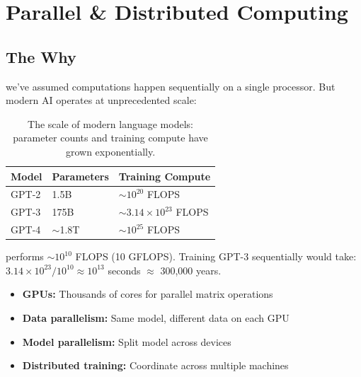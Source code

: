 \chapter{Parallel \& Distributed Computing}



\section{The Why}

 we've assumed computations happen sequentially on a single processor.
But modern AI operates at unprecedented scale:

\begin{table}[ht]
\centering
\begin{tabular}{p{}p{}p{}}
\toprule
\textbf{Model} & \textbf{Parameters} & \textbf{Training Compute} \\
\midrule
GPT-2 & 1.5B & $\sim 10^{20}$ FLOPS \\
GPT-3 & 175B & $\sim 3.14 \times 10^{23}$ FLOPS \\
GPT-4 & $\sim$1.8T & $\sim 10^{25}$ FLOPS \\
\bottomrule
\end{tabular}
\vspace{2em}
\caption{The scale of modern language models: parameter counts and training compute have grown exponentially.}
\label{tab:model_scale}
\end{table}

 performs $\sim 10^{10}$ FLOPS (10 GFLOPS).
Training GPT-3 sequentially would take: $3.14 \times 10^{23} / 10^{10} \approx 10^{13}$ seconds $\approx$ 300,000 years.


\begin{itemize}
    \item \textbf{GPUs:} Thousands of cores for parallel matrix operations
    \item \textbf{Data parallelism:} Same model, different data on each GPU
    \item \textbf{Model parallelism:} Split model across devices
    \item \textbf{Distributed training:} Coordinate across multiple machines
\end{itemize}

